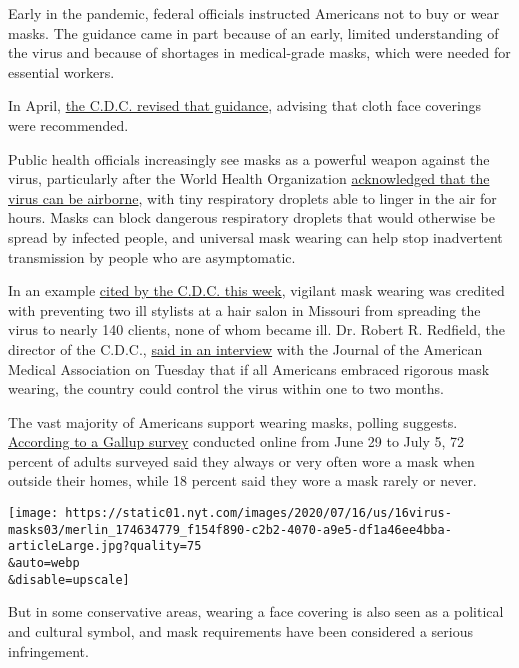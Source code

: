 Early in the pandemic, federal officials instructed Americans not to buy
or wear masks. The guidance came in part because of an early, limited
understanding of the virus and because of shortages in medical-grade
masks, which were needed for essential workers.

In April,
\href{https://www.cdc.gov/coronavirus/2019-ncov/prevent-getting-sick/cloth-face-cover-guidance.html?CDC_AA_refVal=https\%3A\%2F\%2Fwww.cdc.gov\%2Fcoronavirus\%2F2019-ncov\%2Fprevent-getting-sick\%2Fcloth-face-cover.html}{the
C.D.C. revised that guidance}, advising that cloth face coverings were
recommended.

Public health officials increasingly see masks as a powerful weapon
against the virus, particularly after the World Health Organization
\href{https://www.nytimes.com/2020/07/09/health/virus-aerosols-who.html}{acknowledged
that the virus can be airborne}, with tiny respiratory droplets able to
linger in the air for hours. Masks can block dangerous respiratory
droplets that would otherwise be spread by infected people, and
universal mask wearing can help stop inadvertent transmission by people
who are asymptomatic.

In an example
\href{https://www.cdc.gov/media/releases/2020/p0714-americans-to-wear-masks.html}{cited
by the C.D.C. this week}, vigilant mask wearing was credited with
preventing two ill stylists at a hair salon in Missouri from spreading
the virus to nearly 140 clients, none of whom became ill. Dr. Robert R.
Redfield, the director of the C.D.C.,
\href{https://www.youtube.com/watch?v=jzHIhSZ_fiA}{said in an interview}
with the Journal of the American Medical Association on Tuesday that if
all Americans embraced rigorous mask wearing, the country could control
the virus within one to two months.

The vast majority of Americans support wearing masks, polling suggests.
\href{https://news.gallup.com/poll/315590/americans-face-mask-usage-varies-greatly-demographics.aspx}{According
to a Gallup survey} conducted online from June 29 to July 5, 72 percent
of adults surveyed said they always or very often wore a mask when
outside their homes, while 18 percent said they wore a mask rarely or
never.

\texttt{[image: https://static01.nyt.com/images/2020/07/16/us/16virus-masks03/merlin\_174634779\_f154f890-c2b2-4070-a9e5-df1a46ee4bba-articleLarge.jpg?quality=75\\\&auto=webp\\\&disable=upscale]}

But in some conservative areas, wearing a face covering is also seen as
a political and cultural symbol, and mask requirements have been
considered a serious infringement.

